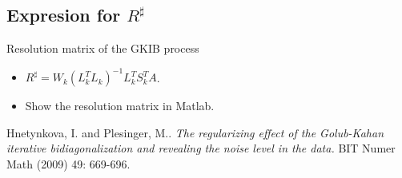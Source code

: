 \documentclass{beamer}
\begin{document}
\subsection{Expresion for $R^{\sharp}$}
\begin{frame}{Resolution matrix of the GKIB process}
  \begin{itemize}
    \item $R^{\sharp} = W_{k}(L_{k}^{T}L_{k})^{-1}L_{k}^{T}S_{k}^{T}A$.
    \item Show the resolution matrix in Matlab.
    \end{itemize}
\end{frame}

\begin{thebibliography}{1}
    Hnetynkova, I. and Plesinger, M.. 
    \emph{The regularizing effect of the Golub-Kahan iterative bidiagonalization 
      and revealing the noise level in the data.}
      BIT Numer Math (2009) 49: 669-696.
\end{thebibliography}
\end{document}

